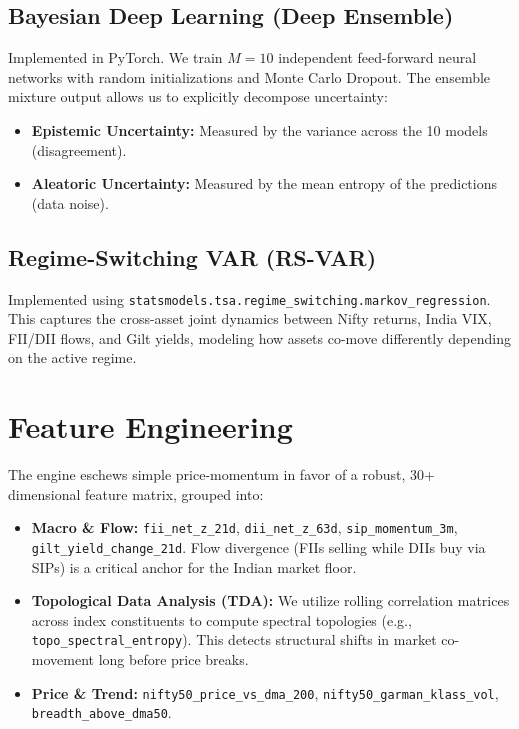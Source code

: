 \documentclass[11pt,a4paper]{article}
\begin{document}
\subsection{Bayesian Deep Learning (Deep Ensemble)}
Implemented in PyTorch. We train $M=10$ independent feed-forward neural networks with random initializations and Monte Carlo Dropout. The ensemble mixture output allows us to explicitly decompose uncertainty:
\begin{itemize}
    \item \textbf{Epistemic Uncertainty:} Measured by the variance across the 10 models (disagreement).
    \item \textbf{Aleatoric Uncertainty:} Measured by the mean entropy of the predictions (data noise).
\end{itemize}

\subsection{Regime-Switching VAR (RS-VAR)}
Implemented using \texttt{statsmodels.tsa.regime\_switching.markov\_regression}. This captures the cross-asset joint dynamics between Nifty returns, India VIX, FII/DII flows, and Gilt yields, modeling how assets co-move differently depending on the active regime.

\section{Feature Engineering}
The engine eschews simple price-momentum in favor of a robust, 30+ dimensional feature matrix, grouped into:
\begin{itemize}
    \item \textbf{Macro \& Flow:} \texttt{fii\_net\_z\_21d}, \texttt{dii\_net\_z\_63d}, \texttt{sip\_momentum\_3m}, \texttt{gilt\_yield\_change\_21d}. Flow divergence (FIIs selling while DIIs buy via SIPs) is a critical anchor for the Indian market floor.
    \item \textbf{Topological Data Analysis (TDA):} We utilize rolling correlation matrices across index constituents to compute spectral topologies (e.g., \texttt{topo\_spectral\_entropy}). This detects structural shifts in market co-movement long before price breaks.
    \item \textbf{Price \& Trend:} \texttt{nifty50\_price\_vs\_dma\_200}, \texttt{nifty50\_garman\_klass\_vol}, \texttt{breadth\_above\_dma50}.
\end{itemize}
\end{document}
